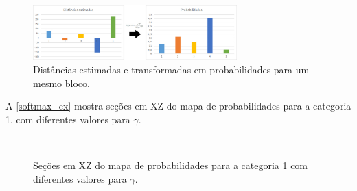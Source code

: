 \begin{figure}[!ht]
	\caption{\label{softmax_grafico}Distâncias estimadas e transformadas em probabilidades para um mesmo bloco.}
	\begin{center}
		\includegraphics[width=0.7\textwidth]{capitulo_2/softmax_bars_final.jpg}
	\end{center}
\end{figure}

A \autoref{softmax_ex} mostra seções em XZ do mapa de probabilidades para a categoria 1, com diferentes valores para $\gamma$.

\begin{figure}[t]
\caption{Seções em XZ do mapa de probabilidades para a categoria 1 com diferentes valores para $\gamma$.} 
\label{softmax_ex}
\begin{center}
\\
\end{center}
\begin{center}
\end{center}
\end{figure}

